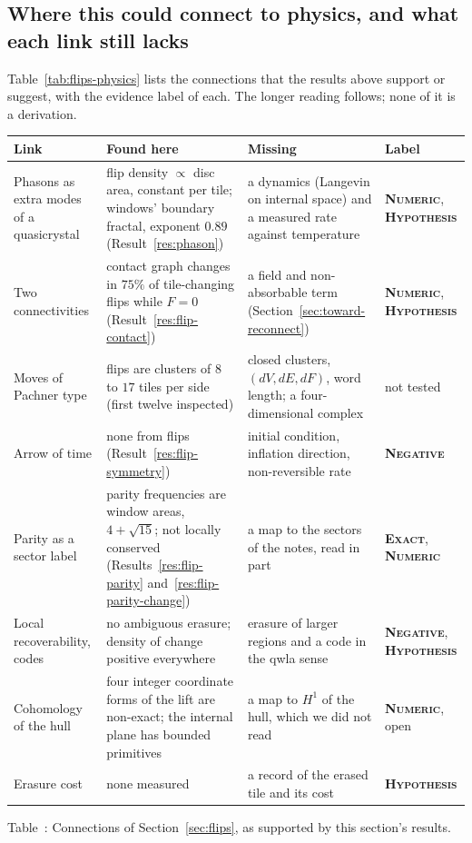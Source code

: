 \documentclass[11pt]{article}
\newcommand{\exact}{\textbf{\textsc{Exact}}}
\newcommand{\numeric}{\textbf{\textsc{Numeric}}}
\newcommand{\hypo}{\textbf{\textsc{Hypothesis}}}
\newcommand{\negres}{\textbf{\textsc{Negative}}}
\theoremstyle{definition}
\begin{document}
\subsection{Where this could connect to physics, and what each link still lacks}\label{sec:flips-physics}
Table~\ref{tab:flips-physics} lists the connections that the results above support or suggest, with the evidence label of each. The longer reading follows; none of it is a derivation.
\begin{center}\footnotesize
\begin{tabular}{@{}p{27mm}p{47mm}p{45mm}p{22mm}@{}}
\toprule
Link & Found here & Missing & Label \\ \midrule
Phasons as extra modes of a quasicrystal \cite{socolar1986} & flip density $\propto$ disc area, constant per tile; windows' boundary fractal, exponent $0.89$ (Result~\ref{res:phason}) & a dynamics (Langevin on internal space) and a measured rate against temperature & \numeric, \hypo \\
Two connectivities & contact graph changes in $75\%$ of tile-changing flips while $F=0$ (Result~\ref{res:flip-contact}) & a field and non-absorbable term (Section~\ref{sec:toward-reconnect}) & \numeric, \hypo \\
Moves of Pachner type \cite{pachner1991} & flips are clusters of $8$ to $17$ tiles per side (first twelve inspected) & closed clusters, $(dV,dE,dF)$, word length; a four-dimensional complex & not tested \\
Arrow of time & none from flips (Result~\ref{res:flip-symmetry}) & initial condition, inflation direction, non-reversible rate & \negres \\
Parity as a sector label & parity frequencies are window areas, $4+\sqrt{15}$; not locally conserved (Results~\ref{res:flip-parity} and~\ref{res:flip-parity-change}) & a map to the sectors of the notes, read in part & \exact, \numeric \\
Local recoverability, codes & no ambiguous erasure; density of change positive everywhere & erasure of larger regions and a code in the qwla sense & \negres, \hypo \\
Cohomology of the hull & four integer coordinate forms of the lift are non-exact; the internal plane has bounded primitives & a map to $H^1$ of the hull, which we did not read & \numeric, open \\
Erasure cost \cite{landauer1961} & none measured & a record of the erased tile and its cost & \hypo \\
\bottomrule
\end{tabular}
\par\smallskip{}\label{tab:flips-physics}Table~\thetable: Connections of Section~\ref{sec:flips}, as supported by this section's results.
\end{center}
\end{document}
